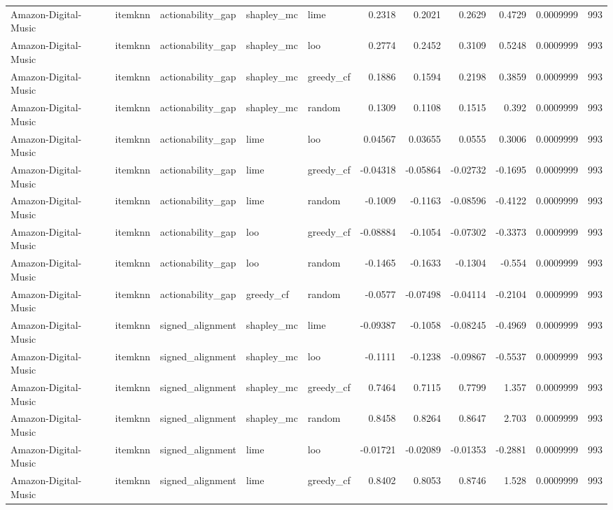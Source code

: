 \begin{table}[t]
\begin{tabular}{lllllrrrrrr}
Amazon-Digital-Music & itemknn & actionability\_gap & shapley\_mc & lime & 0.2318 & 0.2021 & 0.2629 & 0.4729 & 0.0009999 & 993 \\
Amazon-Digital-Music & itemknn & actionability\_gap & shapley\_mc & loo & 0.2774 & 0.2452 & 0.3109 & 0.5248 & 0.0009999 & 993 \\
Amazon-Digital-Music & itemknn & actionability\_gap & shapley\_mc & greedy\_cf & 0.1886 & 0.1594 & 0.2198 & 0.3859 & 0.0009999 & 993 \\
Amazon-Digital-Music & itemknn & actionability\_gap & shapley\_mc & random & 0.1309 & 0.1108 & 0.1515 & 0.392 & 0.0009999 & 993 \\
Amazon-Digital-Music & itemknn & actionability\_gap & lime & loo & 0.04567 & 0.03655 & 0.0555 & 0.3006 & 0.0009999 & 993 \\
Amazon-Digital-Music & itemknn & actionability\_gap & lime & greedy\_cf & -0.04318 & -0.05864 & -0.02732 & -0.1695 & 0.0009999 & 993 \\
Amazon-Digital-Music & itemknn & actionability\_gap & lime & random & -0.1009 & -0.1163 & -0.08596 & -0.4122 & 0.0009999 & 993 \\
Amazon-Digital-Music & itemknn & actionability\_gap & loo & greedy\_cf & -0.08884 & -0.1054 & -0.07302 & -0.3373 & 0.0009999 & 993 \\
Amazon-Digital-Music & itemknn & actionability\_gap & loo & random & -0.1465 & -0.1633 & -0.1304 & -0.554 & 0.0009999 & 993 \\
Amazon-Digital-Music & itemknn & actionability\_gap & greedy\_cf & random & -0.0577 & -0.07498 & -0.04114 & -0.2104 & 0.0009999 & 993 \\
Amazon-Digital-Music & itemknn & signed\_alignment & shapley\_mc & lime & -0.09387 & -0.1058 & -0.08245 & -0.4969 & 0.0009999 & 993 \\
Amazon-Digital-Music & itemknn & signed\_alignment & shapley\_mc & loo & -0.1111 & -0.1238 & -0.09867 & -0.5537 & 0.0009999 & 993 \\
Amazon-Digital-Music & itemknn & signed\_alignment & shapley\_mc & greedy\_cf & 0.7464 & 0.7115 & 0.7799 & 1.357 & 0.0009999 & 993 \\
Amazon-Digital-Music & itemknn & signed\_alignment & shapley\_mc & random & 0.8458 & 0.8264 & 0.8647 & 2.703 & 0.0009999 & 993 \\
Amazon-Digital-Music & itemknn & signed\_alignment & lime & loo & -0.01721 & -0.02089 & -0.01353 & -0.2881 & 0.0009999 & 993 \\
Amazon-Digital-Music & itemknn & signed\_alignment & lime & greedy\_cf & 0.8402 & 0.8053 & 0.8746 & 1.528 & 0.0009999 & 993 \\

\end{tabular}
\end{table}
